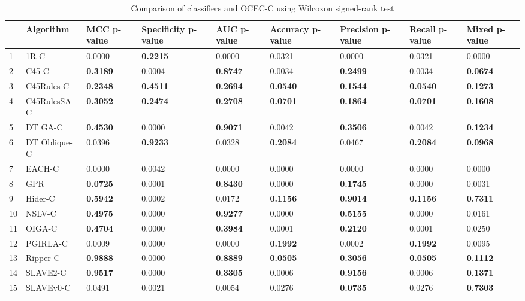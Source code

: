 \begin{table}
\footnotesize
\caption{Comparison of classifiers and OCEC-C using Wilcoxon signed-rank test}
\label{tab:wilcoxon comparison}
\begin{tabular}{lllllllll}
\hline
 & Algorithm & MCC p-value & Specificity p-value & AUC p-value & Accuracy p-value & Precision p-value & Recall p-value & Mixed p-value \\
\hline
1 & 1R-C & 0.0000 & \textbf{0.2215} & 0.0000 & 0.0321 & 0.0000 & 0.0321 & 0.0000 \\
2 & C45-C & \textbf{0.3189} & 0.0004 & \textbf{0.8747} & 0.0034 & \textbf{0.2499} & 0.0034 & \textbf{0.0674} \\
3 & C45Rules-C & \textbf{0.2348} & \textbf{0.4511} & \textbf{0.2694} & \textbf{0.0540} & \textbf{0.1544} & \textbf{0.0540} & \textbf{0.1273} \\
4 & C45RulesSA-C & \textbf{0.3052} & \textbf{0.2474} & \textbf{0.2708} & \textbf{0.0701} & \textbf{0.1864} & \textbf{0.0701} & \textbf{0.1608} \\
5 & DT GA-C & \textbf{0.4530} & 0.0000 & \textbf{0.9071} & 0.0042 & \textbf{0.3506} & 0.0042 & \textbf{0.1234} \\
6 & DT Oblique-C & 0.0396 & \textbf{0.9233} & 0.0328 & \textbf{0.2084} & 0.0467 & \textbf{0.2084} & \textbf{0.0968} \\
7 & EACH-C & 0.0000 & 0.0042 & 0.0000 & 0.0000 & 0.0000 & 0.0000 & 0.0000 \\
8 & GPR & \textbf{0.0725} & 0.0001 & \textbf{0.8430} & 0.0000 & \textbf{0.1745} & 0.0000 & 0.0031 \\
9 & Hider-C & \textbf{0.5942} & 0.0002 & 0.0172 & \textbf{0.1156} & \textbf{0.9014} & \textbf{0.1156} & \textbf{0.7311} \\
10 & NSLV-C & \textbf{0.4975} & 0.0000 & \textbf{0.9277} & 0.0000 & \textbf{0.5155} & 0.0000 & 0.0161 \\
11 & OIGA-C & \textbf{0.4704} & 0.0000 & \textbf{0.3984} & 0.0001 & \textbf{0.2120} & 0.0001 & 0.0250 \\
12 & PGIRLA-C & 0.0009 & 0.0000 & 0.0000 & \textbf{0.1992} & 0.0002 & \textbf{0.1992} & 0.0095 \\
13 & Ripper-C & \textbf{0.9888} & 0.0000 & \textbf{0.8889} & \textbf{0.0505} & \textbf{0.3056} & \textbf{0.0505} & \textbf{0.1112} \\
14 & SLAVE2-C & \textbf{0.9517} & 0.0000 & \textbf{0.3305} & 0.0006 & \textbf{0.9156} & 0.0006 & \textbf{0.1371} \\
15 & SLAVEv0-C & 0.0491 & 0.0021 & 0.0054 & 0.0276 & \textbf{0.0735} & 0.0276 & \textbf{0.7303} \\
\hline
\end{tabular}
\end{table}
